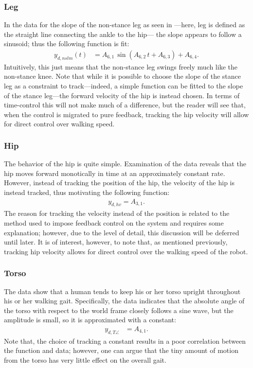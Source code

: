 \subsubsection{Leg}

In the data for the slope of the non-stance leg as seen in
---here, leg is defined as the straight line
connecting the ankle to the hip--- the slope appears to follow a sinusoid; thus
the following function is fit:
%
\begin{align*}
  y_{d,nslm}(t) &= A_{6,1} \, \sin(A_{6,2} \, t + A_{6,3}) + A_{6,4}.
\end{align*}
%
Intuitively, this just means that the non-stance leg swings freely much like the
non-stance knee.
%
Note that while it is possible to choose the slope of the stance leg as a
constraint to track---indeed, a simple function can be fitted to the slope of
the stance leg---the forward velocity of the hip is instead chosen.
%
In terms of time-control this will not make much of a difference, but the reader
will see that, when the control is migrated to pure feedback, tracking the hip
velocity will allow for direct control over walking speed.

\subsubsection{Hip}

The behavior of the hip is quite simple.
%
Examination of the data reveals that the hip moves forward monotically in time
at an approximately constant rate.
%
However, instead of tracking the position of the hip, the velocity of the hip is
instead tracked, thus motivating the following function:
%
\begin{align*}
  y_{d,hv} = A_{3,1}.
\end{align*}
%
The reason for tracking the velocity instead of the position is related to the
method used to impose feedback control on the system and requires some
explanation; however, due to the level of detail, this discussion will be
deferred until later.
%
It is of interest, however, to note that, as mentioned previously, tracking hip
velocity allows for direct control over the walking speed of the robot.

\subsubsection{Torso}

The data show that a human tends to keep his or her torso upright throughout his
or her walking gait.
%
Specifically, the data indicates that the absolute angle of the torso with
respect to the world frame closely follows a sine wave, but the amplitude is
small, so it is approximated with a constant:
%
\begin{align*}
  y_{d,T\angle} &= A_{4,1}.
\end{align*}
%
Note that, the choice of tracking a constant results in a poor correlation
between the function and data; however, one can argue that the tiny amount of
motion from the torso has very little effect on the overall gait.

